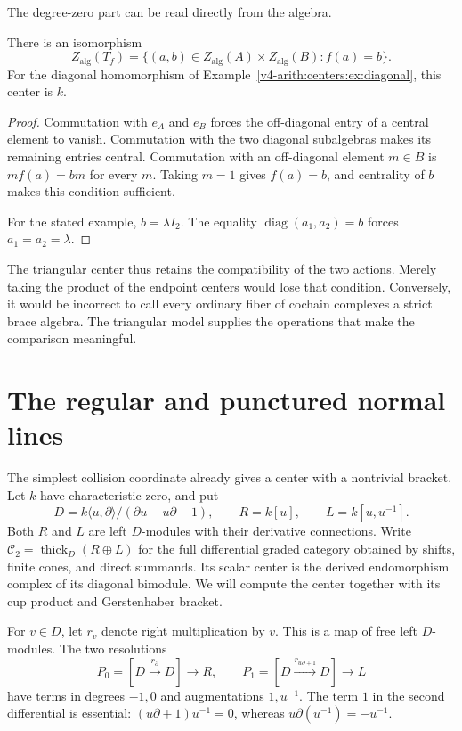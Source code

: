 The degree-zero part can be read directly from
the algebra.

\begin{proposition}\label{v4-arith:centers:prop:triangle-zero}
There is an isomorphism
\[
 Z_{\mathrm{alg}}(T_f)
 =
 \{(a,b)\in Z_{\mathrm{alg}}(A)\times
                 Z_{\mathrm{alg}}(B): f(a)=b\}.
\]
For the diagonal homomorphism of
Example~\ref{v4-arith:centers:ex:diagonal}, this
center is $k$.
\end{proposition}

\begin{proof}
Commutation with $e_A$ and $e_B$ forces the
off-diagonal entry of a central element to vanish.
Commutation with the two diagonal subalgebras
makes its remaining entries central.
Commutation with an off-diagonal element $m\in B$
is
$mf(a)=bm$ for every $m$. Taking $m=1$ gives
$f(a)=b$, and centrality of $b$ makes this condition
sufficient.

For the stated example, $b=\lambda I_2$.
The equality $\operatorname{diag}(a_1,a_2)=b$
forces $a_1=a_2=\lambda$.
\end{proof}

The triangular center thus retains the compatibility
of the two actions. Merely taking the product of
the endpoint centers would lose that condition.
Conversely, it would be incorrect to call every
ordinary fiber of cochain complexes a strict brace
algebra. The triangular model supplies the
operations that make the comparison meaningful.

\section{The regular and punctured normal lines}
\label{v4-arith:centers:sec:normal}

The simplest collision coordinate already gives a center
with a nontrivial bracket. Let $k$ have characteristic zero,
and put
\[
 D=k\langle u,\partial\rangle/(\partial u-u\partial-1),
 \qquad R=k[u],\qquad L=k[u,u^{-1}].
\]
Both $R$ and $L$ are left $D$-modules with their derivative
connections. Write $\mathcal C_2=\operatorname{thick}_D(R\oplus L)$
for the full differential graded category obtained by shifts,
finite cones, and direct summands. Its scalar center is the
derived endomorphism complex of its diagonal bimodule.
We will compute the center together with its cup product
and Gerstenhaber bracket.

For $v\in D$, let $r_v$ denote right multiplication by $v$.
This is a map of free left $D$-modules. The two resolutions
\begin{equation}\label{v4-arith:centers:eq:normal-resolutions}
 P_0=[D\xrightarrow{r_\partial}D]\longrightarrow R,
 \qquad
 P_1=[D\xrightarrow{r_{u\partial+1}}D]\longrightarrow L
\end{equation}
have terms in degrees $-1,0$ and augmentations $1,u^{-1}$.
The term $1$ in the second differential is essential:
$(u\partial+1)u^{-1}=0$, whereas $u\partial(u^{-1})=-u^{-1}$.

